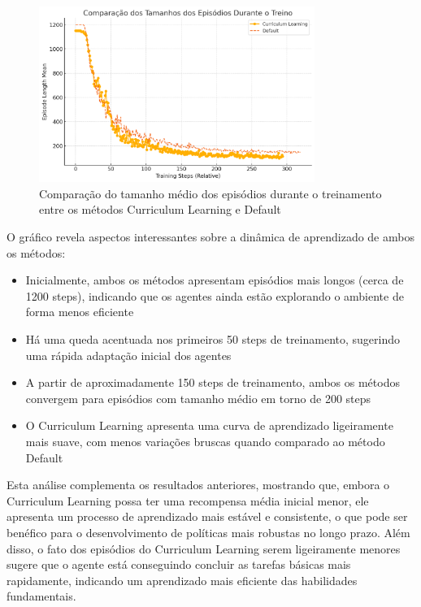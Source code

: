 \begin{figure}[H]
    \centering
    \includegraphics[width=0.8\textwidth]{fig/tamanho_eps.png}
    \caption{Comparação do tamanho médio dos episódios durante o treinamento entre os métodos Curriculum Learning e Default}
    \label{fig:tamanho_eps}
\end{figure}

O gráfico revela aspectos interessantes sobre a dinâmica de aprendizado de ambos os métodos:

\begin{itemize}
    \item Inicialmente, ambos os métodos apresentam episódios mais longos (cerca de 1200 steps), indicando que os agentes ainda estão explorando o ambiente de forma menos eficiente
    
    \item Há uma queda acentuada nos primeiros 50 steps de treinamento, sugerindo uma rápida adaptação inicial dos agentes
    
    \item A partir de aproximadamente 150 steps de treinamento, ambos os métodos convergem para episódios com tamanho médio em torno de 200 steps
    
    \item O Curriculum Learning apresenta uma curva de aprendizado ligeiramente mais suave, com menos variações bruscas quando comparado ao método Default
\end{itemize}

Esta análise complementa os resultados anteriores, mostrando que, embora o Curriculum Learning possa ter uma recompensa média inicial menor, ele apresenta um processo de aprendizado mais estável e consistente, o que pode ser benéfico para o desenvolvimento de políticas mais robustas no longo prazo. Além disso, o fato dos episódios do Curriculum Learning serem ligeiramente menores sugere que o agente está conseguindo concluir as tarefas básicas mais rapidamente, indicando um aprendizado mais eficiente das habilidades fundamentais. 